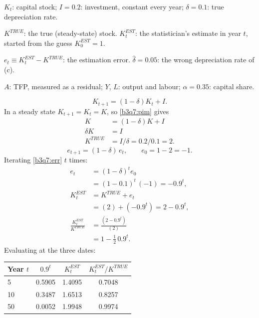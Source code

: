 \begin{sol}
\begin{notacao}
\item $K_t$: capital stock; $I=0.2$: investment, constant every year; $\delta=0.1$: true depreciation rate.
\item $K^{TRUE}$: the true (steady-state) stock. $K^{EST}_t$: the statistician's estimate in year $t$, started from the guess $K^{EST}_0=1$.
\item $e_t\equiv K^{EST}_t-K^{TRUE}$: the estimation error. $\hat\delta=0.05$: the wrong depreciation rate of (c).
\item $A$: TFP, measured as a residual; $Y$, $L$: output and labour; $\alpha=0.35$: capital share.
\end{notacao}
\begin{equation}
K_{t+1}=(1-\delta)K_t+I. \label{b3q7:pim}
\end{equation}
In a steady state $K_{t+1}=K_t=K$, so \eqref{b3q7:pim} gives
\begin{align*}
K&=(1-\delta)K+I\\
\delta K&=I\\
K^{TRUE}&=I/\delta=0.2/0.1=2 .
\end{align*}
\begin{equation}
e_{t+1}=(1-\delta)\,e_t,\qquad e_0=1-2=-1. \label{b3q7:err}
\end{equation}
Iterating \eqref{b3q7:err} $t$ times:
\begin{align*}
e_t&=(1-\delta)^t e_0\\
&=(1-0.1)^t\,(-1)=-0.9^t,\\
K^{EST}_t&=K^{TRUE}+e_t\\
&=(2)+(-0.9^t)=2-0.9^t,\\
\frac{K^{EST}_t}{K^{TRUE}}&=\frac{(2-0.9^t)}{(2)}\\
&=1-\tfrac12\,0.9^t .
\end{align*}
Evaluating at the three dates:
\begin{center}\small
\begin{tabular}{@{}lccc@{}}
\toprule
Year $t$ & $0.9^t$ & $K^{EST}_t$ & $K^{EST}_t/K^{TRUE}$\\
\midrule
5 & 0.5905 & 1.4095 & 0.7048\\
10 & 0.3487 & 1.6513 & 0.8257\\
50 & 0.0052 & 1.9948 & 0.9974\\

\end{tabular}
\end{center}
\end{sol}
